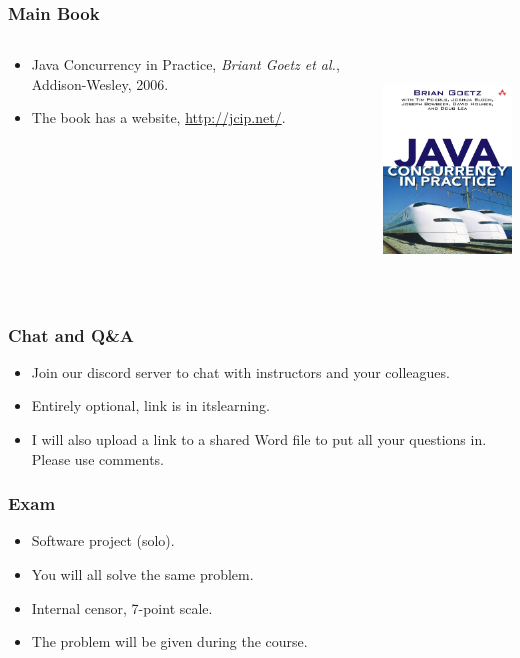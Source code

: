 \documentclass[xcolor={dvipsnames,svgnames},aspectratio=169]{beamer}
\begin{document}
\begin{frame}[fragile]
  \frametitle{Main Book}
  \begin{columns}
    \begin{column}{0.5\textwidth}
      \begin{itemize}
      \item[\faBook] Java Concurrency in Practice, \emph{Briant Goetz et al.},
        Addison-Wesley, 2006.
      \item[\faGlobe] The book has a website, \href{http://jcip.net/}{http://jcip.net/}.
    \end{itemize}
    \end{column}
    \begin{column}{0.5\textwidth}  %
      \begin{center}
        \includegraphics[height=6cm,keepaspectratio]{../media/goetz-book.jpg}
      \end{center}
    \end{column}
  \end{columns}
\end{frame}

\begin{frame}[fragile]
  \frametitle{Chat and Q\&A}
  \begin{itemize}
  \item[\faDiscord] Join our discord server to chat with instructors and your
    colleagues.
  \item[\faDiscord] Entirely optional, link is in itslearning.
  \item[\faFileWord] I will also upload a link to a shared Word file to put all
    your questions in. Please use comments.
  \end{itemize}
\end{frame}

\begin{frame}[fragile]
  \frametitle{Exam}
  \begin{itemize}
  \item[\faGraduationCap] Software project (solo).
  \item[\faGraduationCap] You will all solve the same problem.
  \item[\faGraduationCap] Internal censor, 7-point scale.
  \item[\faGraduationCap] The problem will be given during the course.
  \end{itemize}
\end{frame}
\end{document}
